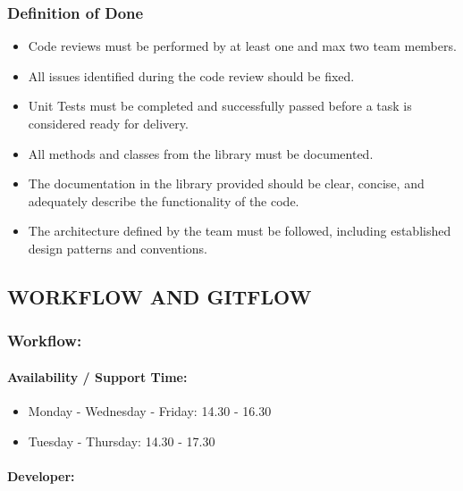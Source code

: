 \hypertarget{definitionofdone}{
\subsubsection{\texorpdfstring{\textbf{Definition of
Done}}{Definition of Done}}\label{definitionofdone}}

\begin{itemize}
\tightlist
\item
  Code reviews must be performed by at least one and max two team
  members.
\item
  All issues identified during the code review should be fixed.
\item
  Unit Tests must be completed and successfully passed before a task is
  considered ready for delivery.
\item
  All methods and classes from the library must be documented.
\item
  The documentation in the library provided should be clear, concise, and adequately
  describe the functionality of the code.
\item
  The architecture defined by the team must be followed, including
  established design patterns and conventions.
\end{itemize}

\newpage

\hypertarget{workflow-gitflow}{
\subsection{WORKFLOW AND GITFLOW}\label{workflow-gitflow}}

\hypertarget{workflow}{
\subsubsection{Workflow:}\label{workflow}}

\hypertarget{availabilitysupporttime}{
\paragraph{Availability / Support
Time:}\label{availabilitysupporttime}}

\begin{itemize}
\tightlist
\item
  Monday - Wednesday - Friday: 14.30 - 16.30
\item
  Tuesday - Thursday: 14.30 - 17.30
\end{itemize}

\hypertarget{developer}{
\paragraph{Developer:}\label{developer}}

